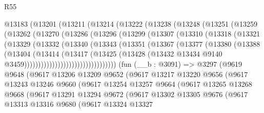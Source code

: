 \begin{lexlean}{R55}
\begin{coremodule}
    @13183
      (@13201
        (@13211
          (@13214
            (@13222
              (@13238
                (@13248
                  (@13251
                    (@13259
                      (@13262
                        (@13270
                          (@13286
                            (@13296
                              (@13299
                                (@13307
                                  (@13310
                                    (@13318
                                      (@13321
                                        (@13329
                                          (@13332
                                            (@13340
                                              (@13343
                                                (@13351
                                                  (@13367
                                                    (@13377
                                                      (@13380
                                                        (@13388
                                                          (@13404
                                                            (@13414
                                                              (@13417
                                                                (@13425
                                                                  (@13428
                                                                    (@13432
                                                                      @13434
                                                                      @9140
                                                                      @3459)))))))))))))))))))))))))))))))))
    (fun (__b : @3091) =>
    @3297
      (@9619
        @9648
        (@9617
          @13206
          @13209
          @9652
          (@9617
            @13217
            @13220
            @9656
            (@9617
              @13243
              @13246
              @9660
              (@9617
                @13254
                @13257
                @9664
                (@9617
                  @13265
                  @13268
                  @9668
                  (@9617
                    @13291
                    @13294
                    @9672
                    (@9617
                      @13302
                      @13305
                      @9676
                      (@9617
                        @13313
                        @13316
                        @9680
                        (@9617
                          @13324
                          @13327

\end{coremodule}
\end{lexlean}
